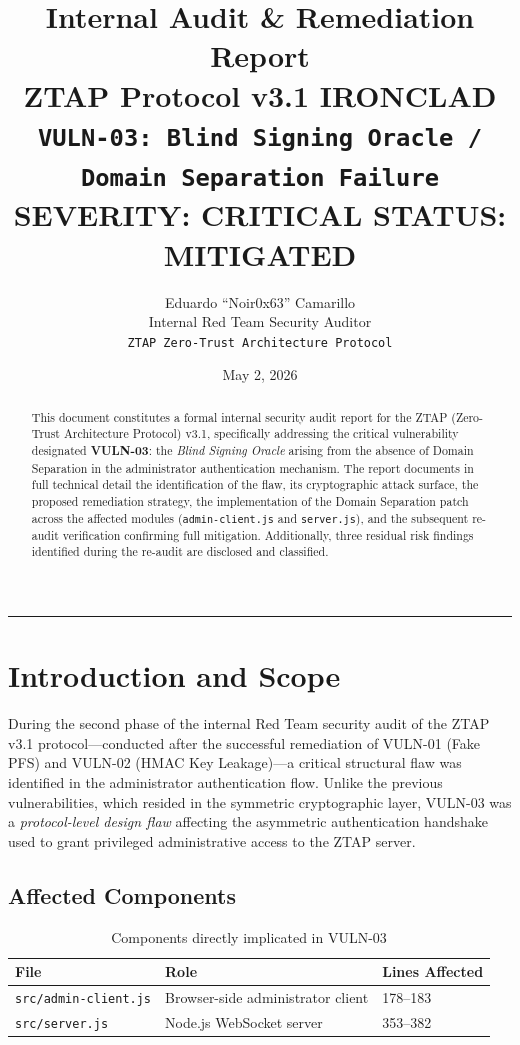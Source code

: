\documentclass[12pt,a4paper]{article}
\title{
    \textbf{Internal Audit \& Remediation Report}\\[0.5em]
    \Large ZTAP Protocol v3.1 IRONCLAD\\[0.3em]
    \large \texttt{VULN-03: Blind Signing Oracle / Domain Separation Failure}\\[1em]
    \normalsize \textcolor{criticalred}{\textbf{SEVERITY: CRITICAL}} \quad
    \textcolor{safegreen}{\textbf{STATUS: MITIGATED}}
}
\author{
    Eduardo ``Noir0x63'' Camarillo\\
    \small Internal Red Team Security Auditor\\
    \small \texttt{ZTAP Zero-Trust Architecture Protocol}
}
\date{May 2, 2026}
\begin{document}

\maketitle
\hrule
\vspace{1em}

\begin{abstract}
This document constitutes a formal internal security audit report for the ZTAP (Zero-Trust Architecture Protocol) v3.1, specifically addressing the critical vulnerability designated \textbf{VULN-03}: the \textit{Blind Signing Oracle} arising from the absence of Domain Separation in the administrator authentication mechanism. The report documents in full technical detail the identification of the flaw, its cryptographic attack surface, the proposed remediation strategy, the implementation of the Domain Separation patch across the affected modules (\texttt{admin-client.js} and \texttt{server.js}), and the subsequent re-audit verification confirming full mitigation. Additionally, three residual risk findings identified during the re-audit are disclosed and classified.
\end{abstract}

\tableofcontents
\newpage

\section{Introduction and Scope}

During the second phase of the internal Red Team security audit of the ZTAP v3.1 protocol---conducted after the successful remediation of VULN-01 (Fake PFS) and VULN-02 (HMAC Key Leakage)---a critical structural flaw was identified in the administrator authentication flow. Unlike the previous vulnerabilities, which resided in the symmetric cryptographic layer, VULN-03 was a \textit{protocol-level design flaw} affecting the asymmetric authentication handshake used to grant privileged administrative access to the ZTAP server.

\subsection{Affected Components}

\begin{table}[h!]
\centering
\begin{tabularx}{\textwidth}{lXl}
\toprule
\textbf{File} & \textbf{Role} & \textbf{Lines Affected} \\
\midrule
\texttt{src/admin-client.js} & Browser-side administrator client & 178--183 \\
\texttt{src/server.js} & Node.js WebSocket server & 353--382 \\
\bottomrule
\end{tabularx}
\caption{Components directly implicated in VULN-03}
\end{table}
\end{document}
